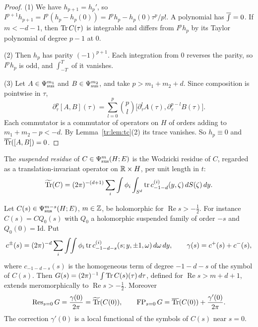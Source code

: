 \begin{proof}
(1) We have \(h_{p+1}=h_p'\), so \(I^{p+1}h_{p+1}=I^p(h_p-h_p(0))=
I^ph_p-h_p(0)\tau^p/p!\). A polynomial has \(\overline{\int}=0\). If \(m<-d-1\),
then \(\operatorname{Tr} C(\tau)\) is integrable and differs from \(I^ph_p\) by its
Taylor polynomial of degree \(p-1\) at \(0\).

(2) Then \(h_p\) has parity \((-1)^{p+1}\). Each integration from \(0\)
reverses the parity, so \(I^ph_p\) is odd, and \(\int_{-T}^T\) of it
vanishes.

(3) Let \(A\in\Psi_{\mathrm{sus}}^{m_1}\) and \(B\in\Psi_{\mathrm{sus}}^{m_2}\), and take \(p>m_1+m_2+d\).
Since composition is pointwise in \(\tau\),
\[
 \partial_\tau^p[A,B](\tau)=\sum_{l=0}^p\binom pl\bigl[\partial_\tau^lA(\tau),
 \partial_\tau^{p-l}B(\tau)\bigr].
\]
Each commutator is a commutator of operators on \(H\) of orders adding to
\(m_1+m_2-p<-d\). By Lemma~\ref{tr:lem:tc}(2) its trace vanishes. So
\(h_p\equiv0\) and \(\overline{\operatorname{Tr}}([A,B])=0\).
\end{proof}

The \emph{suspended residue} of \(C\in\Psi_{\mathrm{sus}}^m(H;E)\) is the Wodzicki
residue of \(C\), regarded as a translation-invariant operator on
\(\mathbb R\times H\), per unit length in \(t\):
\[
 \widetilde{\operatorname{Tr}}(C)=(2\pi)^{-(d+1)}\sum_i\int\phi_i\int_{S^d}\operatorname{tr} c^{(i)}_{-1-d}
 (y,\zeta)\,dS(\zeta)\,dy .
\]

\begin{theorem}\label{tr:thm:susreg}
Let \(C(s)\in\Psi_{\mathrm{sus}}^{m-s}(H;E)\), \(m\in\mathbb Z\), be holomorphic for
\(\operatorname{Re}s>-\frac12\). For instance \(C(s)=CQ_0(s)\) with
\(Q_0\) a holomorphic suspended family of order \(-s\) and
\(Q_0(0)=\mathrm{Id}\). Put
\[
 c^\pm(s)=(2\pi)^{-d}\sum_i\int\!\!\int\phi_i\operatorname{tr} c^{(i)}_{-1-d-s}(s;y,\pm1,
 \omega)\,d\omega\,dy,\qquad\gamma(s)=c^+(s)+c^-(s),
\]
where \(c_{-1-d-s}(s)\) is the homogeneous term of degree \(-1-d-s\) of the
symbol of \(C(s)\). Then \(G(s)=(2\pi)^{-1}\int\operatorname{Tr} C(s)(\tau)\,d\tau\),
defined for \(\operatorname{Re}s>m+d+1\), extends meromorphically to
\(\operatorname{Re}s>-\frac12\). Moreover
\[
 \operatorname{Res}_{s=0}G=\frac{\gamma(0)}{2\pi}=\widetilde{\operatorname{Tr}}(C(0)),\qquad
 \operatorname{FP}_{s=0}G=\overline{\operatorname{Tr}}(C(0))+\frac{\gamma'(0)}{2\pi}.
\]
The correction \(\gamma'(0)\) is a local functional of the symbols of
\(C(s)\) near \(s=0\).
\end{theorem}

